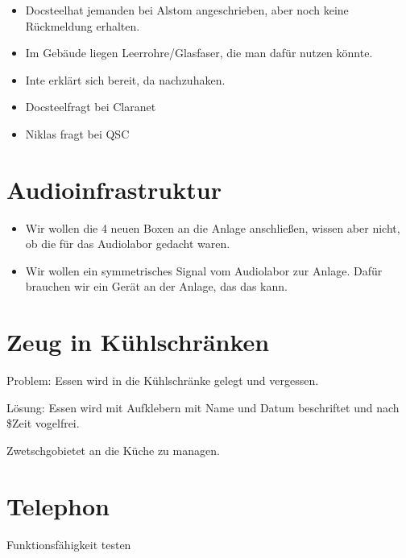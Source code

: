 \documentclass[parskip]{scrartcl}
\newcommand\docsteel{Docsteel}
\newcommand\zwetschgo{Zwetschgo}
\begin{document}
\begin{itemize}
\item{} \docsteel hat jemanden bei Alstom angeschrieben, aber noch keine Rückmeldung erhalten.
\item{} Im Gebäude liegen Leerrohre/Glasfaser, die man dafür nutzen könnte.
\item{} Inte erklärt sich bereit, da nachzuhaken.
\item{} \docsteel fragt bei Claranet
\item{} Niklas fragt bei QSC
\end{itemize}

\section{Audioinfrastruktur}

\begin{itemize}
\item{} Wir wollen die 4 neuen Boxen an die Anlage anschließen, wissen aber nicht, ob die für das Audiolabor gedacht waren.
\item{} Wir wollen ein symmetrisches Signal vom Audiolabor zur Anlage. Dafür brauchen wir ein Gerät an der Anlage, das das kann.
\end{itemize}

\section{Zeug in Kühlschränken}

Problem: Essen wird in die Kühlschränke gelegt und vergessen.

Lösung: Essen wird mit Aufklebern mit Name und Datum beschriftet und nach \$Zeit vogelfrei.

\zwetschgo bietet an die Küche zu managen.

\section{Telephon}

Funktionsfähigkeit testen
\end{document}
